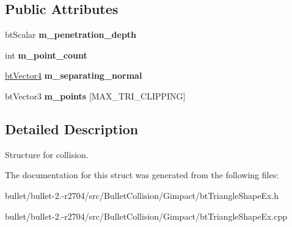 \subsection*{Public Attributes}
\begin{DoxyCompactItemize}
\item 
\hypertarget{struct_g_i_m___t_r_i_a_n_g_l_e___c_o_n_t_a_c_t_a242c6729137a8dba74c68152698cb2cb}{bt\+Scalar {\bfseries m\+\_\+penetration\+\_\+depth}}\label{struct_g_i_m___t_r_i_a_n_g_l_e___c_o_n_t_a_c_t_a242c6729137a8dba74c68152698cb2cb}

\item 
\hypertarget{struct_g_i_m___t_r_i_a_n_g_l_e___c_o_n_t_a_c_t_ac8fba22b83fc01890236d2e746dc5e00}{int {\bfseries m\+\_\+point\+\_\+count}}\label{struct_g_i_m___t_r_i_a_n_g_l_e___c_o_n_t_a_c_t_ac8fba22b83fc01890236d2e746dc5e00}

\item 
\hypertarget{struct_g_i_m___t_r_i_a_n_g_l_e___c_o_n_t_a_c_t_a64ceca536f460f79f6bf927133bda527}{\hyperlink{classbt_vector4}{bt\+Vector4} {\bfseries m\+\_\+separating\+\_\+normal}}\label{struct_g_i_m___t_r_i_a_n_g_l_e___c_o_n_t_a_c_t_a64ceca536f460f79f6bf927133bda527}

\item 
\hypertarget{struct_g_i_m___t_r_i_a_n_g_l_e___c_o_n_t_a_c_t_a1ea4c10a6458e5424c600b806be2f00a}{bt\+Vector3 {\bfseries m\+\_\+points} \mbox{[}M\+A\+X\+\_\+\+T\+R\+I\+\_\+\+C\+L\+I\+P\+P\+I\+N\+G\mbox{]}}\label{struct_g_i_m___t_r_i_a_n_g_l_e___c_o_n_t_a_c_t_a1ea4c10a6458e5424c600b806be2f00a}

\end{DoxyCompactItemize}


\subsection{Detailed Description}
Structure for collision. 

The documentation for this struct was generated from the following files\+:\begin{DoxyCompactItemize}
\item 
bullet/bullet-\/2.-\/r2704/src/\+Bullet\+Collision/\+Gimpact/bt\+Triangle\+Shape\+Ex.\+h\item 
bullet/bullet-\/2.-\/r2704/src/\+Bullet\+Collision/\+Gimpact/bt\+Triangle\+Shape\+Ex.\+cpp\end{DoxyCompactItemize}
